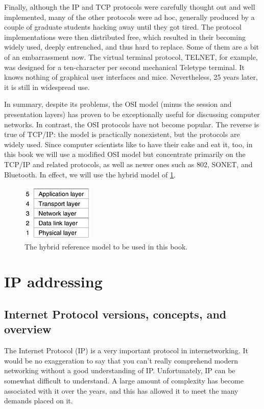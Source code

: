 \documentclass[b5paper,11pt]{memoir}
\begin{document}
Finally, although the IP and TCP protocols were carefully thought out
and well implemented, many of the other protocols were ad hoc, generally
produced by a couple of graduate students hacking away until they got
tired. The protocol implementations were then distributed free, which
resulted in their becoming widely used, deeply entrenched, and thus hard
to replace. Some of them are a bit of an embarrassment now. The virtual
terminal protocol, TELNET, for example, was designed for a ten-character
per second mechanical Teletype terminal. It knows nothing of graphical
user interfaces and mice. Nevertheless, 25 years later, it is still in
widespread use.

In summary, despite its problems, the OSI {model} (minus the session and
presentation layers) has proven to be exceptionally useful for
discussing computer networks. In contrast, the OSI {protocols} have not
become popular. The reverse is true of TCP/IP: the {model} is
practically nonexistent, but the {protocols} are widely used. Since
computer scientists like to have their cake and eat it, too, in this
book we will use a modified OSI model but concentrate primarily on the
TCP/IP and related protocols, as well as newer ones such as 802, SONET,
and Bluetooth.
In effect, we will use the hybrid model of \cref{fig:hybrid-model}.


\begin{figure}
   \centering
   \includegraphics[width=.2\textwidth]{images/01fig24.png}
   \caption{The hybrid reference model to be used in this book.}
   \label{fig:hybrid-model}
\end{figure}



\part{IP addressing}

\chapter{Internet Protocol versions, concepts, and overview}


The Internet Protocol (IP) is a very important protocol in
internetworking. It would be no exaggeration to say that you can't
really comprehend modern networking without a good understanding of IP.
Unfortunately, IP can be somewhat difficult to understand. A large
amount of complexity has become associated with it over the years, and
this has allowed it to meet the many demands placed on it.
\end{document}
